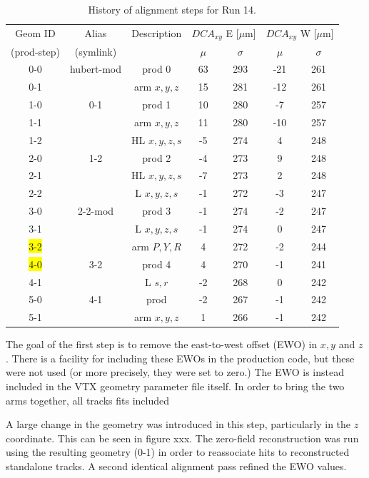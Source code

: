 \documentclass[12pt]{article}
\begin{document}
\begin{table}[htb!]
\centering
\begin{tabular}{c | c | c | c | c | c | c}
Geom ID & Alias & Description & \multicolumn{2}{c}{$DCA_{xy}$ E [$\mu$m]} 
                              & \multicolumn{2}{|c}{$DCA_{xy}$ W [$\mu$m]} \\
(prod-step) & (symlink) &     & $\mu$ & $\sigma$ & $\mu$ & $\sigma$\\
\hline
0-0 & hubert-mod & prod 0    & 63 & 293 & -21 & 261 \\
0-1 & & arm $x,y,z$          & 15 & 281 & -12 & 261 \\
1-0 & 0-1 & prod 1           & 10 & 280 &  -7 & 257 \\
1-1 & & arm $x,y,z$          & 11 & 280 & -10 & 257 \\
1-2 & & HL $x,y,z,s$         & -5 & 274 &   4 & 248 \\
2-0 & 1-2 & prod 2           & -4 & 273 &   9 & 248 \\
2-1 & & HL $x,y,z,s$         & -7 & 273 &   2 & 248 \\
2-2 & & L $x,y,z,s$          & -1 & 272 &  -3 & 247 \\
3-0 & 2-2-mod & prod 3       & -1 & 274 &  -2 & 247 \\
3-1 & & L $x,y,z,s$          & -1 & 274 &   0 & 247 \\
\colorbox{yellow}{3-2} & & arm $P,Y,R$          &  4 & 272 &  -2 & 244 \\
\colorbox{yellow}{4-0} & 3-2 & prod 4           &  4 & 270 &  -1 & 241 \\
4-1 & & L $s,r$              & -2 & 268 &   0 & 242 \\
5-0 & 4-1 & prod             & -2 & 267 &  -1 & 242 \\
5-1 & & arm $x,y,z$          &  1 & 266 &  -1 & 242 \\
\hline
\end{tabular}
\caption{History of alignment steps for Run 14.}
\label{tab:history}
\end{table}

The goal of the first step is to remove the east-to-west offset (EWO) in $x, y$ and $z$. There is a facility for including these EWOs in the production code, but these were not used (or more precisely, they were set to zero.) The EWO is instead included in the VTX geometry parameter file itself. In order to bring the two arms together, all tracks fits included 

A large change in the geometry was introduced in this step, particularly in the $z$ coordinate. This can be seen in figure xxx. The zero-field reconstruction was run using the resulting geometry (0-1) in order to reassociate hits to reconstructed standalone tracks. A second identical alignment pass refined the EWO values.
\end{document}
